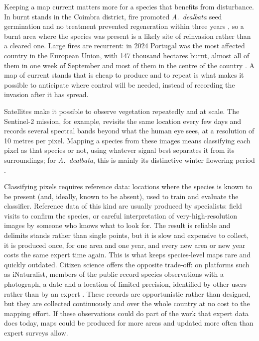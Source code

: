 Keeping a map current matters more for a species that benefits from
disturbance. In burnt stands in the Coimbra district, fire promoted
\emph{A.~dealbata} seed germination and no treatment prevented
regeneration within three years \cite{riveiro2025}, so a burnt area
where the species was present is a likely site of reinvasion rather
than a cleared one. Large fires are recurrent: in 2024 Portugal was
the most affected country in the European Union, with 147 thousand
hectares burnt, almost all of them in one week of September and most
of them in the centre of the country \cite{sanmiguel2025}. A map of
current stands that is cheap to produce and to repeat is what makes it
possible to anticipate where control will be needed, instead of
recording the invasion after it has spread.

Satellites make it possible to observe vegetation repeatedly and at
scale. The Sentinel-2 mission, for example, revisits the same location
every few days and records several spectral bands beyond what the
human eye sees, at a resolution of 10 metres per pixel. Mapping a
species from these images means classifying each pixel as that species
or not, using whatever signal best separates it from its surroundings;
for \emph{A.\ dealbata}, this is mainly its distinctive winter
flowering period \cite{domingo2023,martins2016}.

Classifying pixels requires reference data: locations where the
species is known to be present (and, ideally, known to be absent),
used to train and evaluate the classifier. Reference data of this kind
are usually produced by specialists: field visits to confirm the
species, or careful interpretation of very-high-resolution images by
someone who knows what to look for. The result is reliable and
delimits stands rather than single points, but it is slow and
expensive to collect, it is produced once, for one area and one year,
and every new area or new year costs the same expert time again. This
is what keeps species-level maps rare and quickly outdated. Citizen
science offers the opposite trade-off: on platforms such as
iNaturalist, members of the public record species observations with a
photograph, a date and a location of limited precision, identified by
other users rather than by an expert \cite{gillespie2024}. These
records are opportunistic rather than designed, but they are collected
continuously and over the whole country at no cost to the mapping
effort. If these observations could do part of the work that expert
data does today, maps could be produced for more areas and updated
more often than expert surveys allow.

